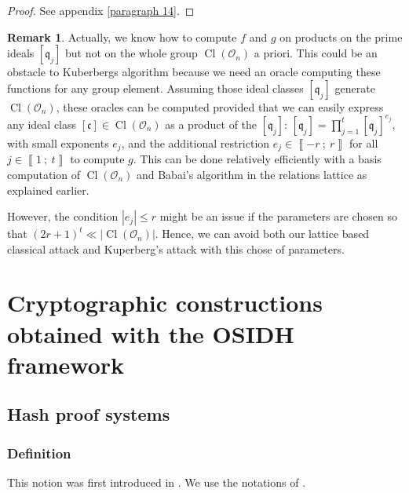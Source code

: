 \documentclass[a4paper,10pt]{report}
\theoremstyle{definition}
\theoremstyle{plain}
\theoremstyle{definition}
\newtheorem{remark}[definition]{Remark}
\newcommand{\mO}{\mathcal{O}}
\renewcommand{\i}[2]{\left\llbracket #1~;~#2\right\rrbracket}
\renewcommand{\(}{\left(}
\renewcommand{\)}{\right)}
\newcommand{\mf}[1]{\mathfrak{#1}}
\DeclareMathOperator{\Cl}{Cl}
\begin{document}
\begin{proof}
See appendix \ref{paragraph 14}.
\end{proof}

\begin{remark}
Actually, we know how to compute $f$ and $g$ on products on the prime ideals $[\mf{q}_j]$ but not on the whole group $\Cl(\mO_n)$ a priori. This could be an obstacle to Kuberbergs algorithm because we need an oracle computing these functions for any group element. Assuming those ideal classes $[\mf{q}_j]$ generate $\Cl(\mO_n)$, these oracles can be computed provided that we can easily express any ideal class $[\mf{c}]\in \Cl(\mO_n)$ as a product of the $[\mf{q}_j]$: $[\mf{q}_j]=\prod_{j=1}^t[\mf{q}_j]^{e_j}$, with small exponents $e_j$, and the additional restriction $e_j\in\i{-r}{r}$ for all $j\in\i{1}{t}$ to compute $g$. This can be done relatively efficiently with a basis computation of $\Cl(\mO_n)$ and Babai's algorithm in the relations lattice as explained earlier.  

However, the condition $|e_j|\leq r$ might be an issue if the parameters are chosen so that $(2r+1)^t\ll |\Cl(\mO_n)|$. Hence, we can avoid both our lattice based classical attack and Kuperberg's attack with this chose of parameters.
\end{remark}

\chapter{Cryptographic constructions obtained with the OSIDH framework}

\section{Hash proof systems}

\subsection{Definition}

This notion was first introduced in \cite{Cramer_Shoup}. We use the notations of \cite{DeFeo1}.
\end{document}
